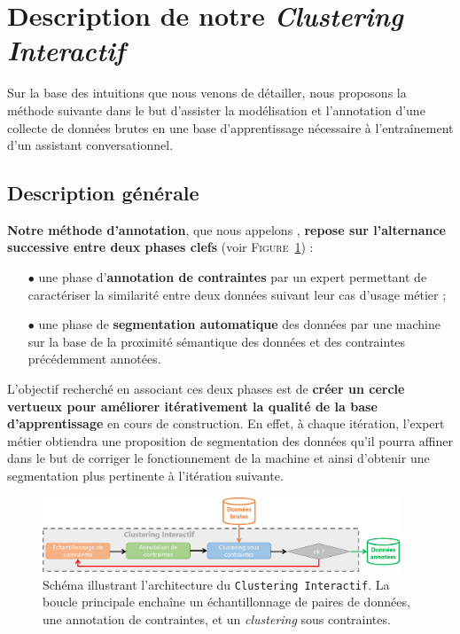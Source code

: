 \section{Description de notre \textit{Clustering Interactif}}
\label{section:3.2-DESCRIPTION-THEORIQUE}

	Sur la base des intuitions que nous venons de détailler, nous proposons la méthode suivante dans le but d'assister la modélisation et l'annotation d'une collecte de données brutes en une base d'apprentissage nécessaire à l'entraînement d'un assistant conversationnel.
	
	\subsection{Description générale}
	\label{section:3.2.1-DESCRIPTION-THEORIQUE-GENERALE}
	
		\textbf{Notre méthode d'annotation}, que nous appelons , \textbf{repose sur l'alternance successive entre deux phases clefs} (voir \textsc{Figure~\ref{figure:3.2.1-DESCRIPTION-THEORIQUE-GENERALE}}) :
		\begin{itemize}
			\item[\(\bullet\)] une phase d'\textbf{annotation de contraintes}
			par un expert permettant de caractériser la similarité entre deux données suivant leur cas d'usage métier ;
			\item[\(\bullet\)] une phase de \textbf{segmentation automatique} des données
			par une machine sur la base de la proximité sémantique des données et des contraintes précédemment annotées.
		\end{itemize}
		
		L'objectif recherché en associant ces deux phases est de \textbf{créer un cercle vertueux pour améliorer itérativement la qualité de la base d'apprentissage} en cours de construction.
		En effet, à chaque itération, l'expert métier obtiendra une proposition de segmentation des données qu'il pourra affiner dans le but de corriger le fonctionnement de la machine et ainsi d'obtenir une segmentation plus pertinente à l'itération suivante.
		
		\begin{figure}[!htb]
			\centering
			\includegraphics[width=0.95\textwidth]{figures/interactive-clustering-architecture-sequentielle}
			\caption{
				Schéma illustrant l'architecture du \texttt{Clustering Interactif}.
				La boucle principale enchaîne un échantillonnage de paires de données, une annotation de contraintes, et un \textit{clustering} sous contraintes.
			}
			\label{figure:3.2.1-DESCRIPTION-THEORIQUE-GENERALE}
		\end{figure}
	
